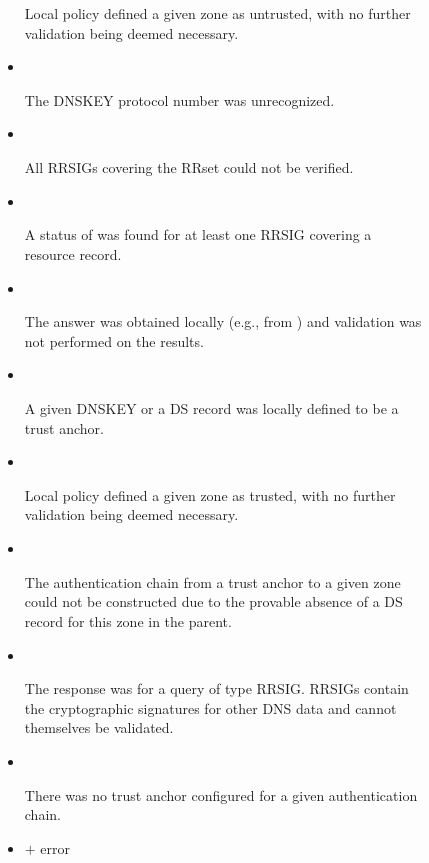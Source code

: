\begin{description}
\begin{description}
\begin{itemize}
Local policy defined a given zone as untrusted, with no further validation
being deemed necessary.

\item {}\verb" "

The DNSKEY protocol number was unrecognized.

\item {}\verb" "

All RRSIGs covering the RRset could not be verified.

\item {}\verb" "

A status of  was found for at least one RRSIG
covering a resource record.

\item {}\verb" "

The answer was obtained locally (e.g., from ) and validation
was not performed on the results.

\item {}\verb" "

A given DNSKEY or a DS record was locally defined to be a trust anchor.

\item {}\verb" "

Local policy defined a given zone as trusted, with no further validation being
deemed necessary.

\item {}\verb" "

The authentication chain from a trust anchor to a given zone could not be
constructed due to the provable absence of a DS record for this zone in the
parent.

\item {}\verb" "

The response was for a query of type RRSIG.  RRSIGs contain the cryptographic
signatures for other DNS data and cannot themselves be validated.

\item {}\verb" "

There was no trust anchor configured for a given authentication chain.

\item {} $+$ error\verb" "


\end{itemize}
\end{description}
\end{description}
